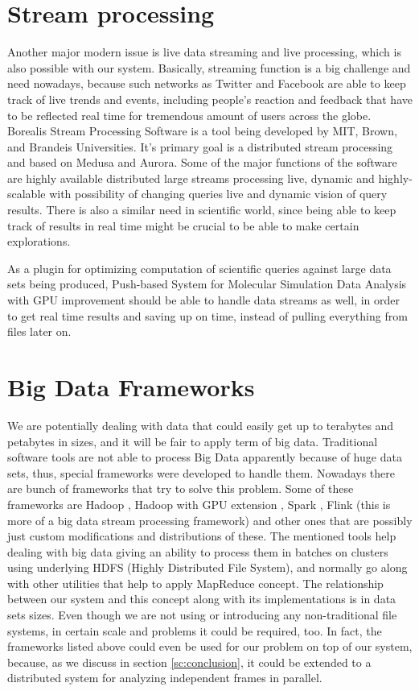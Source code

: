\documentclass[11pt,a4paper]{report}
\begin{document}
\section{Stream processing}
Another major modern issue is live data streaming and live processing, which is also possible with our system. Basically, streaming function is a big challenge and need nowadays, because such networks as Twitter and Facebook are able to keep track of live trends and events, including people's reaction and feedback that have to be reflected real time for tremendous amount of users across the globe. Borealis Stream Processing Software is a tool being developed by MIT, Brown, and Brandeis Universities. It's primary goal is a distributed stream processing and based on Medusa and Aurora. Some of the major functions of the software are highly available distributed large streams processing live, dynamic and highly-scalable with possibility of changing queries live and dynamic vision of query results. \cite{borealis} There is also a similar need in scientific world, since being able to keep track of results in real time might be crucial to be able to make certain explorations. 

As a plugin for optimizing computation of scientific queries against large data sets being produced, Push-based System for Molecular Simulation Data Analysis with GPU improvement should be able to handle data streams as well, in order to get real time results and saving up on time, instead of pulling everything from files later on.

\section{Big Data Frameworks}

We are potentially dealing with data that could easily get up to terabytes and petabytes in sizes, and it will be fair to apply term of big data. Traditional software tools are not able to process Big Data apparently because of huge data sets, thus, special frameworks were developed to handle them. Nowadays there are bunch of frameworks that try to solve this problem. Some of these frameworks are Hadoop \cite{hadoop}, Hadoop with GPU extension \cite{hadoopgpu}, Spark \cite{spark}, Flink \cite{flink} (this is more of a big data stream processing framework) and other ones that are possibly just custom modifications and distributions of these. The mentioned tools help dealing with big data giving an ability to process them in batches on clusters using underlying HDFS (Highly Distributed File System), and normally go along with other utilities that help to apply MapReduce concept. The relationship between our system and this concept along with its implementations is in data sets sizes. Even though we are not using or introducing any non-traditional file systems, in certain scale and problems it could be required, too. In fact, the frameworks listed above could even be used for our problem on top of our system, because, as we discuss in section \ref{sc:conclusion}, it could be extended to a distributed system for analyzing independent frames in parallel. 
\end{document}
